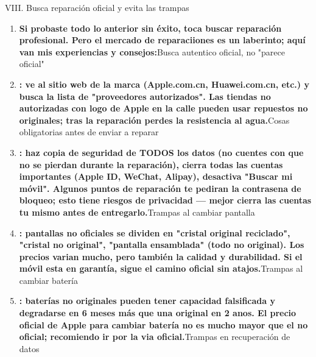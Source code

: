 
VIII. Busca reparación oficial y evita las trampas

\begin{enumerate}
  \item \textbf{Si probaste todo lo anterior sin éxito, toca buscar reparación profesional. Pero el mercado de reparaciiones es un laberinto; aquí van mis experiencias y consejos:}Busca autentico oficial, no "parece oficial"
  \item \textbf{: ve al sitio web de la marca (Apple.com.cn, Huawei.com.cn, etc.) y busca la lista de "proveedores autorizados". Las tiendas no autorizadas con logo de Apple en la calle pueden usar repuestos no originales; tras la reparación perdes la resistencia al agua.}Cosas obligatorias antes de enviar a reparar
  \item \textbf{: haz copia de seguridad de TODOS los datos (no cuentes con que no se pierdan durante la reparación), cierra todas las cuentas importantes (Apple ID, WeChat, Alipay), desactiva "Buscar mi móvil". Algunos puntos de reparación te pediran la contrasena de bloqueo; esto tiene riesgos de privacidad — mejor cierra las cuentas tu mismo antes de entregarlo.}Trampas al cambiar pantalla
  \item \textbf{: pantallas no oficiales se dividen en "cristal original reciclado", "cristal no original", "pantalla ensamblada" (todo no original). Los precios varian mucho, pero también la calidad y durabilidad. Si el móvil esta en garantía, sigue el camino oficial sin atajos.}Trampas al cambiar batería
  \item \textbf{: baterías no originales pueden tener capacidad falsificada y degradarse en 6 meses más que una original en 2 anos. El precio oficial de Apple para cambiar batería no es mucho mayor que el no oficial; recomiendo ir por la via oficial.}Trampas en recuperación de datos
\end{enumerate}


